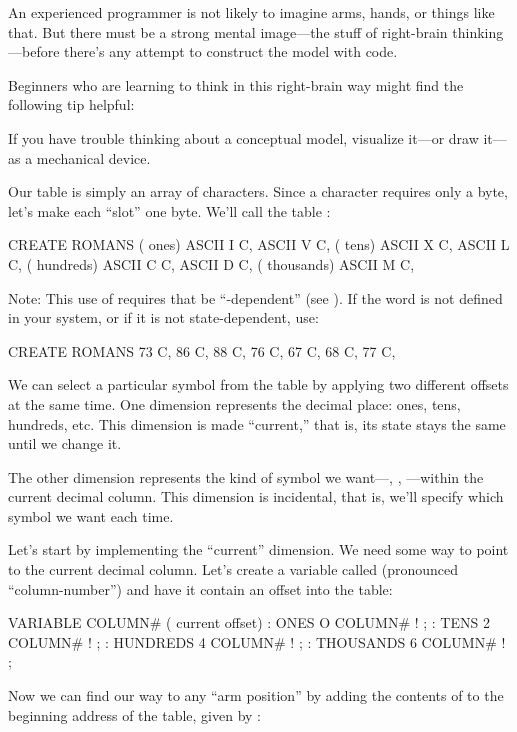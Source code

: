 An experienced \Forth{} programmer is not likely to imagine arms,
hands, or things like that. But there must be a strong mental image---the
stuff of right-brain thinking---before there's any attempt to construct the
model with code.

Beginners who are learning to think in this right-brain way might
find the following tip helpful:

\begin{tip}
If you have trouble thinking about a conceptual model,
visualize it---or draw it---as a mechanical device.
\end{tip}
Our table is simply an array of characters. Since a character requires
only a byte, let's make each ``slot'' one byte. We'll call the table
:

\begin{Code}
CREATE ROMANS    ( ones)  ASCII I  C,   ASCII V  C,
                 ( tens)  ASCII X  C,   ASCII L  C,
             ( hundreds)  ASCII C  C,   ASCII D  C,
            ( thousands)  ASCII M  C,
\end{Code}
Note: This use of  requires that  be
``-dependent'' (see ). If the word 
is not defined in your system, or if it is not state-dependent, use:

\begin{Code}
CREATE ROMANS  73 C,  86 C,  88 C,  76 C,
   67 C,  68 C,  77 C,
\end{Code}
We can select a particular symbol from the table by applying two
different offsets at the same time. One dimension represents the decimal
place: ones, tens, hundreds, etc. This dimension is made ``current,'' that
is, its state stays the same until we change it.

The other dimension represents the kind of symbol we want---,
, ---within the current decimal column. This
dimension is incidental, that is, we'll specify which symbol we want each
time.

Let's start by implementing the ``current'' dimension. We need
some way to point to the current decimal column. Let's create a variable
called  (pronounced ``column-number'') and have it contain an
offset into the table:

\begin{Code}
VARIABLE COLUMN#  ( current offset)
: ONES        O COLUMN# ! ;
: TENS        2 COLUMN# ! ;
: HUNDREDS    4 COLUMN# ! ;
: THOUSANDS   6 COLUMN# ! ;
\end{Code}
Now we can find our way to any ``arm position'' by adding the contents of
 to the beginning address of the table, given by
:

